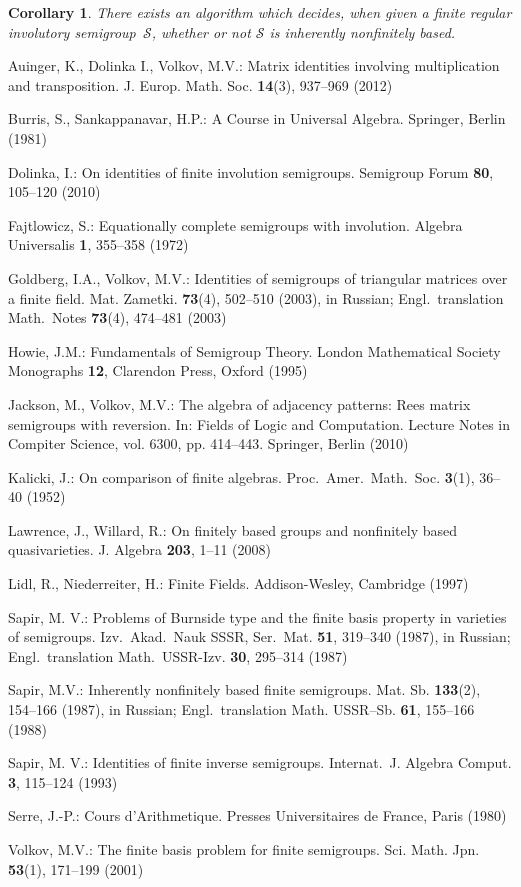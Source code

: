 \documentclass[smallextended]{svjour3}
\newcommand{\is}{involutory semi\-group}
\newcommand{\infb}{inherently non\-finitely based}
\newtheorem{Cor}[Thm]{Corollary}
\begin{document}
\begin{Cor}
There exists an algorithm which decides, when given a  finite regular \is\ $\mathcal{S}$, whether or not $\mathcal{S}$ is \infb.
\end{Cor}


\begin{thebibliography}{99}
Auinger, K., Dolinka I., Volkov, M.V.: Matrix identities involving multiplication and transposition. J. Europ. Math. Soc. \textbf{14}(3),
937--969 (2012)

Burris, S., Sankappanavar, H.P.: A Course in Universal Algebra. Springer, Berlin (1981)

Dolinka, I.: On identities of finite involution semigroups. Semigroup Forum \textbf{80}, 105--120 (2010)

Fajtlowicz, S.: Equationally complete semigroups with involution. Algebra Universalis \textbf{1}, 355--358 (1972)

Goldberg, I.A., Volkov, M.V.: Identities of semigroups of triangular matrices over a finite field. Mat. Zametki. \textbf{73}(4), 502--510
(2003), in Russian; Engl.\ translation Math.\ Notes \textbf{73}(4), 474--481 (2003)

Howie, J.M.: Fundamentals of Semigroup Theory. London Mathematical Society Monographs \textbf{12}, Clarendon Press, Oxford (1995)

Jackson, M., Volkov, M.V.: The algebra of adjacency patterns: Rees matrix semigroups with reversion. In: Fields of Logic and Computation.
Lecture Notes in Compiter Science, vol. 6300, pp. 414--443. Springer, Berlin (2010)

Kalicki, J.: On comparison of finite algebras. Proc.\ Amer.\ Math.\ Soc. \textbf{3}(1), 36--40 (1952)

Lawrence, J.,  Willard, R.: On finitely based groups and nonfinitely based quasivarieties. J. Algebra \textbf{203}, 1--11 (2008)

Lidl, R., Niederreiter, H.: Finite Fields. Addison-Wesley, Cambridge (1997)

Sapir, M. V.: Problems of Burnside type and the finite basis property in varieties of semigroups. Izv.\ Akad.\ Nauk SSSR, Ser.\ Mat.
\textbf{51}, 319--340 (1987), in Russian; Engl.\ translation Math.\ USSR-Izv. \textbf{30}, 295--314 (1987)

Sapir, M.V.: Inherently nonfinitely based finite semigroups. Mat. Sb. \textbf{133}(2), 154--166 (1987), in Russian; Engl.\ translation
Math. USSR--Sb. \textbf{61}, 155--166 (1988)

Sapir, M. V.: Identities of finite inverse semigroups. Internat.\ J. Algebra Comput. \textbf{3}, 115--124 (1993)

Serre, J.-P.: Cours d'Arithmetique. Presses Universitaires de France, Paris (1980)

Volkov, M.V.: The finite basis problem for finite semigroups. Sci. Math. Jpn. \textbf{53}(1), 171--199 (2001)
\end{thebibliography}
\end{document}
